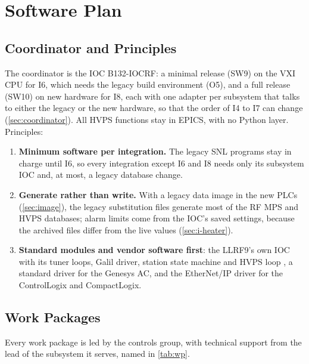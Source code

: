 \section{Software Plan}\label{sec:software}

\subsection{Coordinator and Principles}\label{sec:principles}

The coordinator is the IOC \mbox{B132-IOCRF}: a minimal release (SW9) on the VXI CPU
for I6, which needs the legacy build environment (O5), and a full release (SW10) on new
hardware for I8, each with one adapter per subsystem that talks to either the legacy or
the new hardware, so that the order of I4 to I7 can change (\cref{sec:coordinator}).
All HVPS functions stay in EPICS, with no Python layer. Principles:
\begin{enumerate}
\item \textbf{Minimum software per integration.} The legacy SNL programs stay in charge
until I6, so every integration except I6 and I8 needs only its subsystem IOC and, at most, a
legacy database change.
\item \textbf{Generate rather than write.} With a legacy data image in the new PLCs
(\cref{sec:image}), the legacy substitution files generate most of the RF MPS and HVPS
databases; alarm limits come from the IOC's saved settings, because the archived files
differ from the live values (\cref{sec:i-heater}).
\item \textbf{Standard modules and vendor software first}: the LLRF9's own IOC with its
tuner loops, Galil driver, station state machine and HVPS loop , a standard
driver for the Genesys AC, and the EtherNet/IP driver for the ControlLogix and
CompactLogix.
\end{enumerate}

\subsection{Work Packages}\label{sec:wp}

Every work package is led by the controls group, with technical support from the lead
of the subsystem it serves, named in \cref{tab:wp}.

